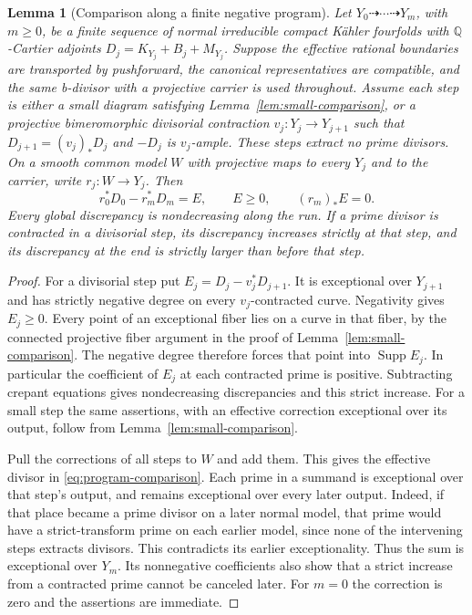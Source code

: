 \documentclass[11pt]{amsart}
\newtheorem{lemma}[theorem]{Lemma}
\theoremstyle{definition}
\theoremstyle{remark}
\numberwithin{equation}{section}
\newcommand{\Q}{\mathbb{Q}}
\DeclareMathOperator{\Supp}{Supp}
\begin{document}
\begin{lemma}[Comparison along a finite negative program]
\label{lem:program-comparison}
Let $Y_0\dashrightarrow\cdots\dashrightarrow Y_m$, with $m\geq0$, be
a finite sequence of normal irreducible compact K\"ahler fourfolds with
$\Q$-Cartier adjoints $D_j=K_{Y_j}+B_j+M_{Y_j}$.  Suppose the effective
rational boundaries are transported by pushforward, the canonical
representatives are compatible, and the same b-divisor with a projective
carrier is used throughout.  Assume
each step is either a small diagram satisfying
Lemma~\ref{lem:small-comparison}, or a projective bimeromorphic
divisorial contraction $v_j:Y_j\to Y_{j+1}$ such that
$D_{j+1}=(v_j)_*D_j$ and $-D_j$ is $v_j$-ample.  These steps extract
no prime divisors.  On a smooth common model $W$ with projective maps
to every $Y_j$ and to the carrier, write $r_j:W\to Y_j$.  Then
\begin{equation}\label{eq:program-comparison}
 r_0^*D_0-r_m^*D_m=E,\qquad E\geq0,\qquad (r_m)_*E=0.
\end{equation}
Every global discrepancy is nondecreasing along the run.  If a prime
divisor is contracted in a divisorial step, its discrepancy increases
strictly at that step, and its discrepancy at the end is strictly
larger than before that step.
\end{lemma}

\begin{proof}
For a divisorial step put
$E_j=D_j-v_j^*D_{j+1}$.  It is exceptional over $Y_{j+1}$ and has
strictly negative degree on every $v_j$-contracted curve.  Negativity
gives $E_j\geq0$.  Every point of an exceptional fiber lies on a curve
in that fiber, by the connected projective fiber argument in the proof
of Lemma~\ref{lem:small-comparison}.  The negative degree therefore
forces that point into $\Supp E_j$.  In particular the coefficient of
$E_j$ at each contracted prime is positive.  Subtracting crepant
equations gives nondecreasing discrepancies and this strict increase.
For a small step the same assertions, with an effective correction
exceptional over its output, follow from
Lemma~\ref{lem:small-comparison}.

Pull the corrections of all steps to $W$ and add them.  This gives the
effective divisor in \eqref{eq:program-comparison}.  Each prime in a
summand is exceptional over that step's output, and remains exceptional
over every later output.  Indeed, if that place became a prime divisor
on a later normal model, that prime would have a strict-transform prime
on each earlier model, since none of the intervening steps extracts divisors.
This contradicts its earlier exceptionality.  Thus the sum is
exceptional over $Y_m$.  Its nonnegative coefficients also show that
a strict increase from a contracted prime cannot be canceled later.
For $m=0$ the correction is zero and the assertions are immediate.
\end{proof}
\end{document}
